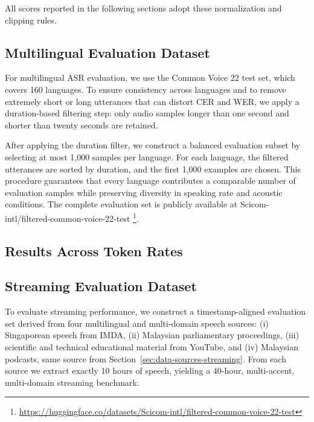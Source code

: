 \documentclass{article}
\begin{document}
All scores reported in the following sections adopt these normalization and clipping rules.

\subsection{Multilingual Evaluation Dataset}

For multilingual ASR evaluation, we use the Common Voice 22 test set, which covers 160 languages. To ensure consistency across languages and to remove extremely short or long utterances that can distort CER and WER, we apply a duration-based filtering step: only audio samples longer than one second and shorter than twenty seconds are retained.

After applying the duration filter, we construct a balanced evaluation subset by selecting at most 1{,}000 samples per language. For each language, the filtered utterances are sorted by duration, and the first 1{,}000 examples are chosen. This procedure guarantees that every language contributes a comparable number of evaluation samples while preserving diversity in speaking rate and acoustic conditions. The complete evaluation set is publicly available at Scicom-intl/filtered-common-voice-22-test \footnote{ \url{https://huggingface.co/datasets/Scicom-intl/filtered-common-voice-22-test}}.

\subsection{Results Across Token Rates}

\subsection{Streaming Evaluation Dataset}

To evaluate streaming performance, we construct a timestamp-aligned evaluation set derived from 
four multilingual and multi-domain speech sources: (i) Singaporean speech from IMDA, 
(ii) Malaysian parliamentary proceedings, (iii) scientific and technical educational material 
from YouTube, and (iv) Malaysian podcasts, same source from Section~\ref{sec:data-sources-streaming}. From each source we extract exactly 10 hours of 
speech, yielding a 40-hour, multi-accent, multi-domain streaming benchmark.
\end{document}

